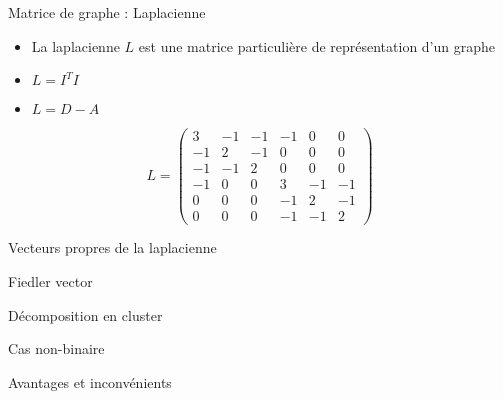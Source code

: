 \begin{frame}{Matrice de graphe : Laplacienne}
    \begin{minipage}{0.49\linewidth}
        \begin{itemize}
            \item La \alert{laplacienne} $L$ est une matrice particulière de représentation d'un graphe
            \item $L = I^{T}I$
            \item $L = D - A$
        \end{itemize}
        \footnotesize{$$
            L = \begin{pmatrix}
                3 & -1 & -1 & -1 & 0 & 0\\
                -1 & 2 & -1 & 0 & 0 & 0\\
                -1 & -1 & 2 & 0 & 0 & 0\\
                -1 & 0 & 0 & 3 & -1 & -1\\
                0 & 0 & 0 & -1 & 2 & -1\\
                0 & 0 & 0 & -1 & -1 & 2
            \end{pmatrix}
        $$}
    \end{minipage}
    \begin{minipage}{0.49\linewidth}
    \end{minipage}
\end{frame}

\begin{frame}{Vecteurs propres de la laplacienne}
\end{frame}
 
\begin{frame}{Fiedler vector}
\end{frame}

\begin{frame}{Décomposition en cluster}
\end{frame}

\begin{frame}{Cas non-binaire}
\end{frame}

\begin{frame}{Avantages et inconvénients}
\end{frame}